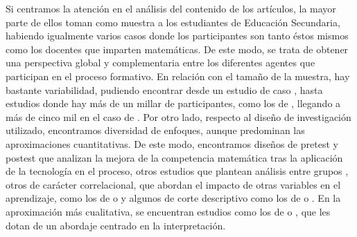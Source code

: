 \documentclass[spanish]{textolivre}
\begin{document}
Si centramos la atención en el análisis del contenido de los artículos, la mayor parte de ellos toman como muestra a los estudiantes de Educación Secundaria, habiendo igualmente varios casos donde los participantes son tanto éstos mismos como los docentes que imparten matemáticas. De este modo, se trata de obtener una perspectiva global y complementaria entre los diferentes agentes que participan en el proceso formativo. En relación con el tamaño de la muestra, hay bastante variabilidad, pudiendo encontrar desde un estudio de caso \cite{petrov_effect_2020}, hasta estudios donde hay más de un millar de participantes, como los de \textcite{benitez__effects_2019,garcia-martin_use_2019,gomez-garcia_technological_2020,hossein-mohand_uses_2021}, llegando a más de cinco mil en el caso de \textcite{gil-quintana_learning_2020}. Por otro lado, respecto al diseño de investigación utilizado, encontramos diversidad de enfoques, aunque predominan las aproximaciones cuantitativas. De este modo, encontramos diseños de pretest y postest \cite{del_cerro_application_2021,hossein-mohand_uses_2021,petrov_effect_2020,silva-diaz_uso_2021} que analizan la mejora de la competencia matemática tras la aplicación de la tecnología en el proceso, otros estudios que plantean análisis entre grupos \cite{benitez__effects_2019,lopez_formative_2019}, otros de carácter correlacional, que abordan el impacto de otras variables en el aprendizaje, como los de \textcite{gil-quintana_learning_2020} o \textcite{gomez-garcia_technological_2020} y algunos de corte descriptivo como los de \textcite{aris_educational_2019} o \textcite{iglesias_aprendizaje_2020}. En la aproximación más cualitativa, se encuentran estudios como los de \textcite{beltran_modelado_2017} o \textcite{weinhandl_real-world_2021}, que les dotan de un abordaje centrado en la interpretación.
\end{document}
